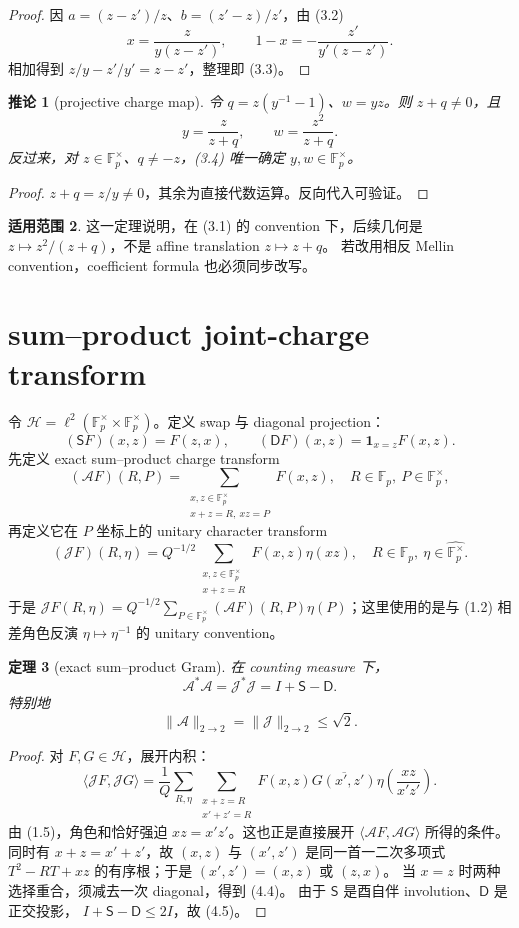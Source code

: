 \documentclass[11pt,a4paper]{ctexart}
\newtheorem{theorem}{定理}[section]
\newtheorem{corollary}[theorem]{推论}
\theoremstyle{definition}
\newtheorem{remark}[theorem]{适用范围}
\newcommand{\F}{\mathbb F}
\newcommand{\G}{\F_p^\times}
\newcommand{\Gh}{\widehat{\G}}
\newcommand{\1}{\mathbf 1}
\begin{document}
\begin{proof}
因 $a=(z-z')/z$、$b=(z'-z)/z'$，由 (3.2)
\[
x=\frac{z}{y(z-z')},\qquad
1-x=-\frac{z'}{y'(z-z')}.
\]
相加得到 $z/y-z'/y'=z-z'$，整理即 (3.3)。
\end{proof}

\begin{corollary}[projective charge map]
令 $q=z(y^{-1}-1)$、$w=yz$。则 $z+q\ne0$，且
\[
\boxed{y=\frac{z}{z+q},\qquad
w=\frac{z^2}{z+q}.}
\tag{3.4}
\]
反过来，对 $z\in\G$、$q\ne-z$，(3.4) 唯一确定 $y,w\in\G$。
\end{corollary}

\begin{proof}
$z+q=z/y\ne0$，其余为直接代数运算。反向代入可验证。
\end{proof}

\begin{remark}
这一定理说明，在 (3.1) 的 convention 下，后续几何是
$z\mapsto z^2/(z+q)$，不是 affine translation $z\mapsto z+q$。
若改用相反 Mellin convention，coefficient formula 也必须同步改写。
\end{remark}

\section{sum--product joint-charge transform}

令 $\mathscr H=\ell^2(\G\times\G)$。定义 swap 与 diagonal projection：
\[
(\mathsf SF)(x,z)=F(z,x),\qquad
(\mathsf DF)(x,z)=\1_{x=z}F(x,z).
\tag{4.1}
\]
先定义 exact sum--product charge transform
\[
(\mathcal AF)(R,P)
=\sum_{\substack{x,z\in\G\\x+z=R,\ xz=P}}F(x,z),
\quad R\in\F_p,\ P\in\G,
\tag{4.2}
\]
再定义它在 $P$ 坐标上的 unitary character transform
\[
(\mathcal JF)(R,\eta)
=Q^{-1/2}\sum_{\substack{x,z\in\G\\x+z=R}}
F(x,z)\eta(xz),
\quad R\in\F_p,\ \eta\in\Gh.
\tag{4.3}
\]
于是
\(
\mathcal JF(R,\eta)=Q^{-1/2}\sum_{P\in\G}(\mathcal AF)(R,P)\eta(P)
\)；这里使用的是与 (1.2) 相差角色反演 $\eta\mapsto\eta^{-1}$ 的
unitary convention。

\begin{theorem}[exact sum--product Gram]
在 counting measure 下，
\[
\boxed{\mathcal A^*\mathcal A
=\mathcal J^*\mathcal J=I+\mathsf S-\mathsf D.}
\tag{4.4}
\]
特别地
\[
\boxed{\|\mathcal A\|_{2\to2}
=\|\mathcal J\|_{2\to2}\le\sqrt2.}
\tag{4.5}
\]
\end{theorem}

\begin{proof}
对 $F,G\in\mathscr H$，展开内积：
\[
\langle\mathcal JF,\mathcal JG\rangle
=\frac1Q\sum_{R,\eta}
\sum_{\substack{x+z=R\\x'+z'=R}}
F(x,z)\overline{G(x',z')}
\eta\!\left(\frac{xz}{x'z'}\right).
\]
由 (1.5)，角色和恰好强迫 $xz=x'z'$。这也正是直接展开
$\langle\mathcal AF,\mathcal AG\rangle$ 所得的条件。同时有
$x+z=x'+z'$，故 $(x,z)$ 与 $(x',z')$ 是同一首一二次多项式
$T^2-RT+xz$ 的有序根；于是 $(x',z')=(x,z)$ 或 $(z,x)$。
当 $x=z$ 时两种选择重合，须减去一次 diagonal，得到 (4.4)。
由于 $\mathsf S$ 是酉自伴 involution、$\mathsf D$ 是正交投影，
$I+\mathsf S-\mathsf D\le2I$，故 (4.5)。
\end{proof}
\end{document}
